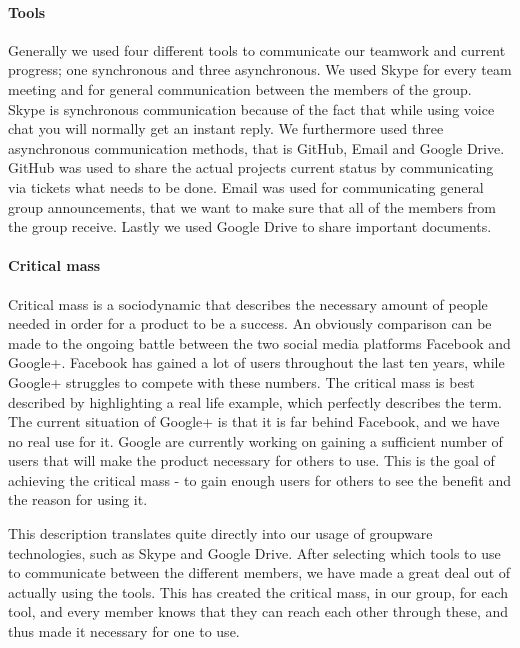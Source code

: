 \paragraph{Tools} \label{par:tools}
Generally we used four different tools to communicate our teamwork and current progress; one synchronous and three asynchronous. We used Skype for every team meeting and for general communication between the members of the group. Skype is synchronous communication because of the fact that while using voice chat you will normally get an instant reply. We furthermore used three asynchronous communication methods, that is GitHub, Email and Google Drive. GitHub was used to share the actual projects current status by communicating via tickets what needs to be done. Email was used for communicating general group announcements, that we want to make sure that all of the members from the group receive. Lastly we used Google Drive to share important documents.  

\paragraph{Critical mass} \label{par:criticalmass}
Critical mass \cite{grudin1994groupware} is a sociodynamic that describes the necessary amount of people needed in order for a product to be a success. An obviously comparison can be made to the ongoing battle between the two social media platforms Facebook and Google+. Facebook has gained a lot of users throughout the last ten years, while Google+ struggles to compete with these numbers. The critical mass is best described by highlighting a real life example, which perfectly describes the term. The current situation of Google+ is that it is far behind Facebook, and we have no real use for it. Google are currently working on gaining a sufficient number of users that will make the product necessary for others to use. This is the goal of achieving the critical mass - to gain enough users for others to see the benefit and the reason for using it. 

This description translates quite directly into our usage of groupware technologies, such as Skype and Google Drive. After selecting which tools to use to communicate between the different members, we have made a great deal out of actually using the tools. This has created the critical mass, in our group, for each tool, and every member knows that they can reach each other through these, and thus made it necessary for one to use.

